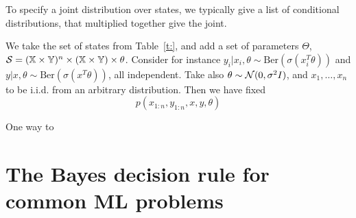 To specify a joint distribution over states, we typically give a list of conditional distributions, that multiplied together give the joint. 

\begin{example}[Classification]
    \label{ex:classification}
    We take the set of states from Table~\ref{t:}, and add a set of parameters $\Theta$, $\mathcal{S} = (\mathbb{X}\times\mathbb{Y})^n \times (\mathbb{X}\times\mathbb{Y}) \times \theta$.
    Consider for instance $y_i\vert x_i, \theta \sim \mathrm{Ber}(\sigma(x_i^T\theta))$ and $y\vert x, \theta \sim \mathrm{Ber}(\sigma(x^T\theta))$, all independent. Take also $\theta\sim \mathcal{N}(0,\sigma^2 I)$, and $x_1, \dots, x_n$ to be i.i.d. from an arbitrary distribution. 
    Then we have fixed
    $$
        p(x_{1:n}, y_{1:n}, x, y, \theta)
    $$

 
    One way to 
\end{example}


\section{The Bayes decision rule for common ML problems}